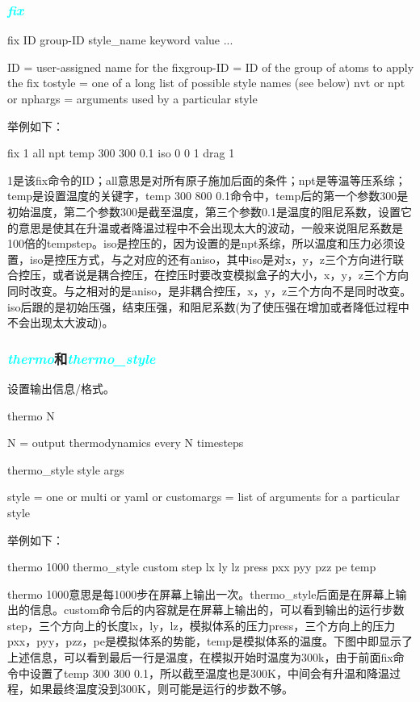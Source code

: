 \frame
{
	\frametitle{\textcolor{cyan}{\textit{fix}}}
	fix ID group-ID style_name keyword value ...

    ID = user-assigned name for the fixgroup-ID = ID of the group of atoms to apply the fix tostyle = one of a long list of possible style names (see below)
        nvt or npt or nphargs = arguments used by a particular style

举例如下：

fix 1 all npt temp 300 300 0.1 iso 0 0 1 drag 1

1是该fix命令的ID；all意思是对所有原子施加后面的条件；npt是等温等压系综；temp是设置温度的关键字，temp 300 800 0.1命令中，temp后的第一个参数300是初始温度，第二个参数300是截至温度，第三个参数0.1是温度的阻尼系数，设置它的意思是使其在升温或者降温过程中不会出现太大的波动，一般来说阻尼系数是100倍的tempstep。iso是控压的，因为设置的是npt系综，所以温度和压力必须设置，iso是控压方式，与之对应的还有aniso，其中iso是对x，y，z三个方向进行联合控压，或者说是耦合控压，在控压时要改变模拟盒子的大小，x，y，z三个方向同时改变。与之相对的是aniso，是非耦合控压，x，y，z三个方向不是同时改变。iso后跟的是初始压强，结束压强，和阻尼系数(为了使压强在增加或者降低过程中不会出现太大波动)。
}

\frame
{
	\frametitle{\textcolor{cyan}{\textit{thermo}}和\textcolor{cyan}{\textit{thermo\_style}}}
	设置输出信息/格式。

thermo N

    N = output thermodynamics every N timesteps

thermo_style style args

    style = one or multi or yaml or customargs = list of arguments for a particular style

举例如下：

thermo 1000
thermo_style custom step lx ly lz press pxx pyy pzz pe temp

thermo 1000意思是每1000步在屏幕上输出一次。thermo_style后面是在屏幕上输出的信息。custom命令后的内容就是在屏幕上输出的，可以看到输出的运行步数step，三个方向上的长度lx，ly，lz，模拟体系的压力press，三个方向上的压力pxx，pyy，pzz，pe是模拟体系的势能，temp是模拟体系的温度。下图中即显示了上述信息，可以看到最后一行是温度，在模拟开始时温度为300k，由于前面fix命令中设置了temp 300 300 0.1，所以截至温度也是300K，中间会有升温和降温过程，如果最终温度没到300K，则可能是运行的步数不够。
}


